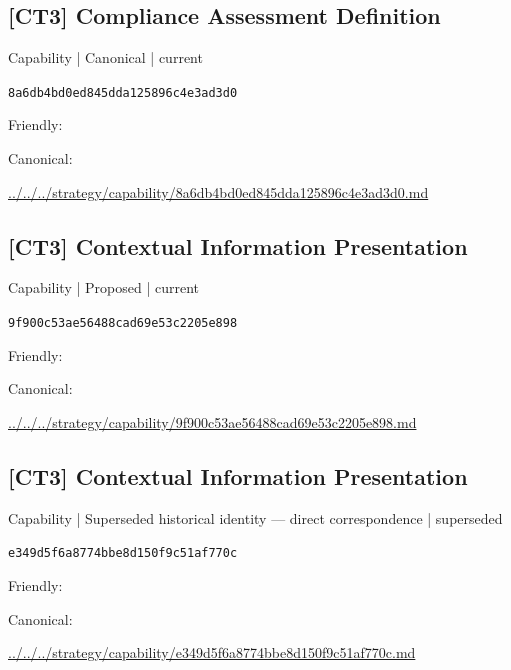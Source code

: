 \documentclass[10pt,a4paper]{article}
\begin{document}
\subsection*{[CT3] Compliance Assessment Definition}
{\small Capability | Canonical | current}\par
\texttt{8a6db4bd0ed845dda125896c4e3ad3d0}\par
Friendly: \par
Canonical: \par
{\footnotesize\url{../../../strategy/capability/8a6db4bd0ed845dda125896c4e3ad3d0.md}}\par
\subsection*{[CT3] Contextual Information Presentation}
{\small Capability | Proposed | current}\par
\texttt{9f900c53ae56488cad69e53c2205e898}\par
Friendly: \par
Canonical: \par
{\footnotesize\url{../../../strategy/capability/9f900c53ae56488cad69e53c2205e898.md}}\par
\subsection*{[CT3] Contextual Information Presentation}
{\small Capability | Superseded historical identity — direct correspondence | superseded}\par
\texttt{e349d5f6a8774bbe8d150f9c51af770c}\par
Friendly: \par
Canonical: \par
{\footnotesize\url{../../../strategy/capability/e349d5f6a8774bbe8d150f9c51af770c.md}}\par
\end{document}
